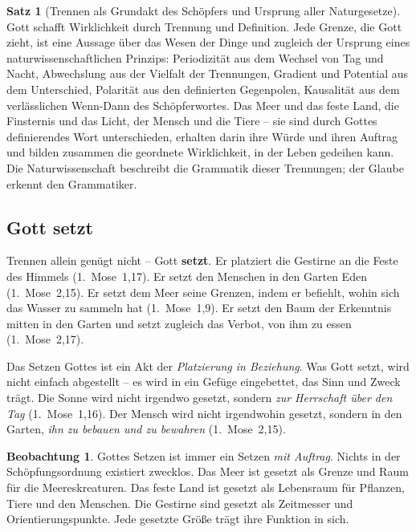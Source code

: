 ﻿\documentclass[a4paper,12pt]{article}
\theoremstyle{definition}
\newtheorem{theorem}{Satz}[section]
\newtheorem{observation}{Beobachtung}[section]
\begin{document}
\begin{theorem}[Trennen als Grundakt des Schöpfers und Ursprung aller Naturgesetze]
	Gott schafft Wirklichkeit durch Trennung und Definition. Jede Grenze, die Gott
	zieht, ist eine Aussage über das Wesen der Dinge und zugleich der Ursprung eines
	naturwissenschaftlichen Prinzips: Periodizität aus dem Wechsel von Tag und Nacht,
	Abwechslung aus der Vielfalt der Trennungen, Gradient und Potential aus dem
	Unterschied, Polarität aus den definierten Gegenpolen, Kausalität aus dem
	verlässlichen Wenn-Dann des Schöpferwortes. Das Meer und das feste Land,
	die Finsternis und das Licht, der Mensch und die Tiere -- sie sind durch Gottes
	definierendes Wort unterschieden, erhalten darin ihre Würde und ihren Auftrag
	und bilden zusammen die geordnete Wirklichkeit, in der Leben gedeihen kann.
	Die Naturwissenschaft beschreibt die Grammatik dieser Trennungen; der Glaube
	erkennt den Grammatiker.
\end{theorem}

\subsection{Gott setzt}

Trennen allein genügt nicht -- Gott \textbf{setzt}. Er platziert die Gestirne
an die Feste des Himmels (1.~Mose~1,17). Er setzt den Menschen in den Garten Eden
(1.~Mose~2,15). Er setzt dem Meer seine Grenzen, indem er befiehlt, wohin sich das
Wasser zu sammeln hat (1.~Mose~1,9). Er setzt den Baum der Erkenntnis mitten in
den Garten und setzt zugleich das Verbot, von ihm zu essen (1.~Mose~2,17).

Das Setzen Gottes ist ein Akt der \textit{Platzierung in Beziehung}. Was Gott
setzt, wird nicht einfach abgestellt -- es wird in ein Gefüge eingebettet, das
Sinn und Zweck trägt. Die Sonne wird nicht irgendwo gesetzt, sondern \textit{zur
	Herrschaft über den Tag} (1.~Mose~1,16). Der Mensch wird nicht irgendwohin gesetzt,
sondern in den Garten, \textit{ihn zu bebauen und zu bewahren} (1.~Mose~2,15).

\begin{observation}
	Gottes Setzen ist immer ein Setzen \textit{mit Auftrag}. Nichts in der
	Schöpfungsordnung existiert zwecklos. Das Meer ist gesetzt als Grenze und
	Raum für die Meereskreaturen. Das feste Land ist gesetzt als Lebensraum für
	Pflanzen, Tiere und den Menschen. Die Gestirne sind gesetzt als Zeitmesser und
	Orientierungspunkte. Jede gesetzte Größe trägt ihre Funktion in sich.
\end{observation}
\end{document}
